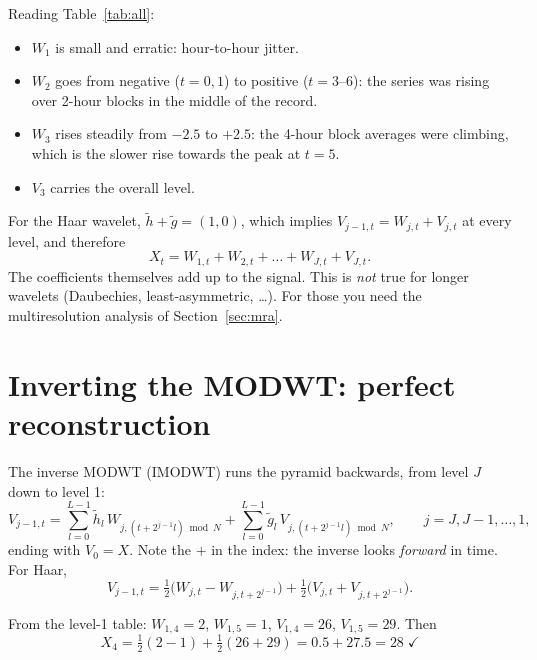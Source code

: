 \documentclass[11pt,a4paper]{article}
\newcommand{\hwav}{\tilde{h}}
\newcommand{\gsc}{\tilde{g}}
\begin{document}
\begin{table}[H]
\centering

\caption{The complete Haar MODWT of $X$. Every row sums back to $X_t$.}
\label{tab:all}
\end{table}

Reading Table~\ref{tab:all}:
\begin{itemize}[leftmargin=1.5em]
  \item $W_1$ is small and erratic: hour-to-hour jitter.
  \item $W_2$ goes from negative ($t=0,1$) to positive ($t=3$--$6$): the series was rising over 2-hour blocks in the middle of the record.
  \item $W_3$ rises steadily from $-2.5$ to $+2.5$: the 4-hour block averages were climbing, which is the slower rise towards the peak at $t=5$.
  \item $V_3$ carries the overall level.
\end{itemize}

\begin{keybox}
For the Haar wavelet, $\hwav+\gsc=(1,0)$, which implies $V_{j-1,t}=W_{j,t}+V_{j,t}$ at every level, and therefore
\[
  X_t = W_{1,t}+W_{2,t}+\dots+W_{J,t}+V_{J,t}.
\]
The coefficients themselves add up to the signal. This is \emph{not} true for longer wavelets (Daubechies,
least-asymmetric, \dots). For those you need the multiresolution analysis of Section~\ref{sec:mra}.
\end{keybox}

\section{Inverting the MODWT: perfect reconstruction}

The inverse MODWT (IMODWT) runs the pyramid backwards, from level $J$ down to level 1:
\begin{equation}
  V_{j-1,t} = \sum_{l=0}^{L-1}\hwav_l\,W_{j,(t+2^{j-1}l)\bmod N} + \sum_{l=0}^{L-1}\gsc_l\,V_{j,(t+2^{j-1}l)\bmod N},
  \qquad j=J,J-1,\dots,1,
  \label{eq:inverse}
\end{equation}
ending with $V_{0}=X$. Note the $+$ in the index: the inverse looks \emph{forward} in time. For Haar,
\[
  V_{j-1,t} = \tfrac12\big(W_{j,t} - W_{j,t+2^{j-1}}\big) + \tfrac12\big(V_{j,t} + V_{j,t+2^{j-1}}\big).
\]

\begin{examplebox}
From the level-1 table: $W_{1,4}=2$, $W_{1,5}=1$, $V_{1,4}=26$, $V_{1,5}=29$. Then
\[
  X_4 = \tfrac12(2-1) + \tfrac12(26+29) = 0.5 + 27.5 = 28 \;\checkmark
\]
\end{examplebox}
\end{document}
